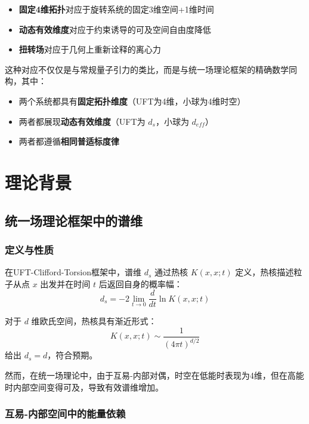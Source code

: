 \documentclass[12pt,a4paper]{article}
\begin{document}
\begin{itemize}
    \item \textbf{固定4维拓扑}对应于旋转系统的固定3维空间+1维时间
    \item \textbf{动态有效维度}对应于约束诱导的可及空间自由度降低
    \item \textbf{扭转场}对应于几何上重新诠释的离心力
\end{itemize}

这种对应不仅仅是与常规量子引力的类比，而是与统一场理论框架的精确数学同构，其中：
\begin{itemize}
    \item 两个系统都具有\textbf{固定拓扑维度}（UFT为4维，小球为4维时空）
    \item 两者都展现\textbf{动态有效维度}（UFT为 $d_s$，小球为 $d_{eff}$）
    \item 两者都遵循\textbf{相同普适标度律}
\end{itemize}

\section{理论背景}
\label{sec:theory}

\subsection{统一场理论框架中的谱维}

\subsubsection{定义与性质}

在UFT-Clifford-Torsion框架中，谱维 $d_s$ 通过热核 $K(x,x;t)$ 定义，热核描述粒子从点 $x$ 出发并在时间 $t$ 后返回自身的概率幅：
\begin{equation}
    d_s = -2 \lim_{t \to 0} \frac{d}{dt} \ln K(x,x;t)
\end{equation}

对于 $d$ 维欧氏空间，热核具有渐近形式：
\begin{equation}
    K(x,x;t) \sim \frac{1}{(4\pi t)^{d/2}}
\end{equation}
给出 $d_s = d$，符合预期。

然而，在统一场理论中，由于互易-内部对偶，时空在低能时表现为4维，但在高能时内部空间变得可及，导致有效谱维增加。

\subsubsection{互易-内部空间中的能量依赖}
\end{document}
